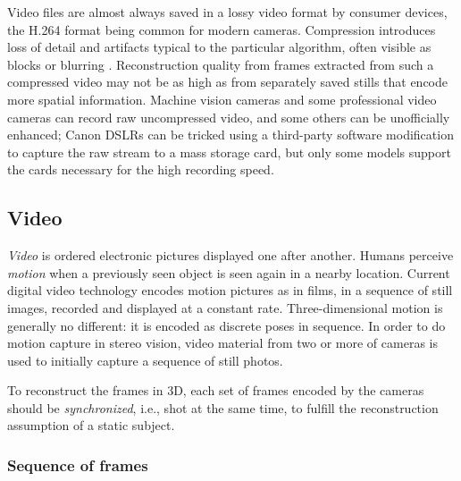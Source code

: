 
Video files are almost always saved in a lossy video format by consumer devices, the H.264 format being common for modern cameras.
Compression introduces loss of detail and artifacts typical to the particular algorithm, often visible as blocks or blurring \cite{richardson2004h264}.
Reconstruction quality from frames extracted from such a compressed video may not be as high as from separately saved stills that encode more spatial information.
Machine vision cameras and some professional video cameras can record raw uncompressed video, and some others can be unofficially enhanced;
Canon DSLRs can be tricked using a third-party software modification \cite{magiclantern} to capture the raw stream to a mass storage card, but only some models support the cards necessary for the high recording speed.


\subsection{Video} \label{sec:video} %



\emph{Video} is ordered electronic pictures displayed one after another.
Humans perceive \emph{motion} when a previously seen object is seen again in a nearby location.
Current digital video technology encodes motion pictures as in films, in a sequence of still images, recorded and displayed at a constant rate.
Three-dimensional motion is generally no different: it is encoded as discrete poses in sequence.
In order to do motion capture in stereo vision, video material from two or more of cameras is used to initially capture a sequence of still photos.

To reconstruct the frames in 3D, each set of frames encoded by the cameras should be \emph{synchronized}, i.e., shot at the same time, to fulfill the reconstruction assumption of a static subject.


\subsubsection{Sequence of frames} %

